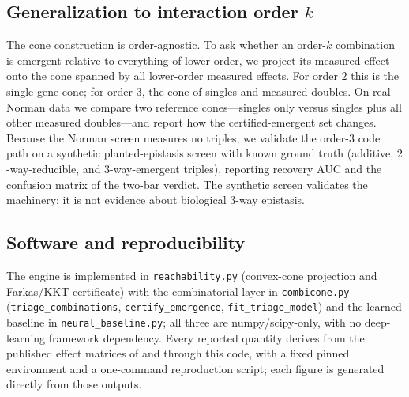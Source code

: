 \subsection{Generalization to interaction order $k$}
\label{sec:methods-kway}
The cone construction is order-agnostic. To ask whether an order-$k$ combination is emergent relative
to everything of lower order, we project its measured effect onto the cone spanned by all lower-order
measured effects. For order $2$ this is the single-gene cone; for order $3$, the cone of singles and
measured doubles. On real Norman data we compare two reference cones---singles only versus singles
plus all other measured doubles---and report how the certified-emergent set changes. Because the
Norman screen measures no triples, we validate the order-$3$ code path on a synthetic
planted-epistasis screen with known ground truth (additive, $2$-way-reducible, and $3$-way-emergent
triples), reporting recovery AUC and the confusion matrix of the two-bar verdict. The synthetic screen
validates the machinery; it is not evidence about biological $3$-way epistasis.

\subsection{Software and reproducibility}
\label{sec:methods-software}
The engine is implemented in \texttt{reachability.py} (convex-cone projection and Farkas/KKT
certificate) with the combinatorial layer in \texttt{combicone.py} (\texttt{triage\_combinations},
\texttt{certify\_emergence}, \texttt{fit\_triage\_model}) and the learned baseline in
\texttt{neural\_baseline.py}; all three are numpy/scipy-only, with no deep-learning framework
dependency. Every reported quantity derives from the published effect matrices of \citet{Norman2019}
and \citet{Wessels2023} through this code, with a fixed pinned environment and a one-command
reproduction script; each figure is generated directly from those outputs.
